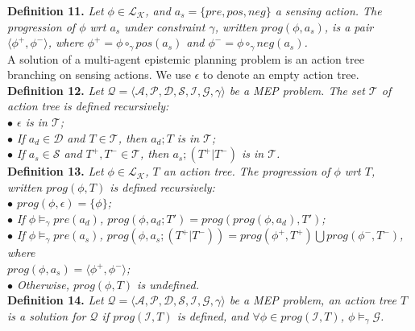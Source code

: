 \documentclass{llncs}
\begin{document}
\textbf{Definition 11.} \textit{Let $\phi\in\mathcal{L}_\mathcal{K}$, and $a_s = \{pre, pos, neg\}$ a sensing action. The progression of $\phi$ wrt $a_s$ under constraint $\gamma$, written $prog(\phi, a_s)$, is a pair $\langle \phi^+, \phi^-\rangle$, where $\phi^+=\phi\circ_\gamma pos(a_s)$ and $\phi^-=\phi\circ_\gamma neg(a_s)$.}\vspace{0.05in}\\
A solution of a multi-agent epistemic planning problem is an action tree branching on sensing actions. We use $\epsilon$ to denote an empty action tree.\vspace{0.05in}\\
\textbf{Definition 12.} \textit{Let $\mathcal{Q}=\langle\mathcal{A}, \mathcal{P}, \mathcal{D}, \mathcal{S}, \mathcal{I}, \mathcal{G}, \gamma\rangle$ be a MEP problem. The set $\mathcal{T}$ of action tree is defined recursively:\\
\hspace*{0.1in}$\bullet$ $\epsilon$ is in $\mathcal{T}$;\\
\hspace*{0.1in}$\bullet$ If $a_d\in\mathcal{D}$ and $T\in\mathcal{T}$, then $a_d;T$ is in $\mathcal{T}$;\\
\hspace*{0.1in}$\bullet$ If $a_s\in\mathcal{S}$ and $T^+,T^-\in\mathcal{T}$, then $a_s;(T^+|T^-)$ is in $\mathcal{T}$.}\vspace{0.05in}\\
\textbf{Definition 13.} \textit{Let $\phi\in\mathcal{L}_\mathcal{K}$, $T$ an action tree. The progression of $\phi$ wrt $T$, written $prog(\phi, T)$ is defined recursively:\\
\hspace*{0.1in}$\bullet$ $prog(\phi,\epsilon)=\{\phi\}$;\\
\hspace*{0.1in}$\bullet$ If $\phi\models_\gamma pre(a_d)$, $prog(\phi, a_d;T')=prog(prog(\phi, a_d), T')$;\\
\hspace*{0.1in}$\bullet$ If $\phi\models_\gamma pre(a_s)$, $prog(\phi, a_s;(T^+|T^-))=prog(\phi^+, T^+)\bigcup prog(\phi^-, T^-)$, where\\
\hspace*{0.1in}\hspace{0.1in}$prog(\phi, a_s)=\langle \phi^+,\phi^-\rangle$;\\
\hspace*{0.1in}$\bullet$ Otherwise, $prog(\phi, T)$ is undefined.}\vspace{0.05in}\\
\textbf{Definition 14.} \textit{Let $\mathcal{Q}=\langle\mathcal{A}, \mathcal{P}, \mathcal{D}, \mathcal{S}, \mathcal{I}, \mathcal{G}, \gamma\rangle$ be a MEP problem, an action tree $T$ is a solution for $\mathcal{Q}$ if $prog(\mathcal{I}, T)$ is defined, and $\forall \phi\in prog(\mathcal{I}, T)$, $\phi\models_\gamma\mathcal{G}$.}
\end{document}
